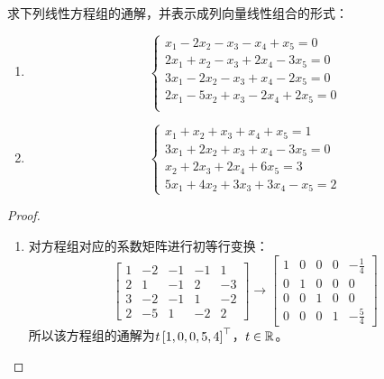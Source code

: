 \begin{problem}\label{problem-2.29}
求下列线性方程组的通解，并表示成列向量线性组合的形式：
\begin{enumerate}
    \item
          {
          \begin{equation*}
              \begin{cases}
                  x_1-2x_2-x_3-x_4+x_5=0    \\
                  2x_1+x_2-x_3+2x_4-3x_5=0  \\
                  3x_1-2x_2-x_3+x_4-2x_5=0  \\
                  2x_1-5x_2+x_3-2x_4+2x_5=0 \\
              \end{cases}
          \end{equation*}
          }
    \item \begin{equation*}
              \begin{cases}
                  x_1+x_2+x_3+x_4+x_5=1    \\
                  3x_1+2x_2+x_3+x_4-3x_5=0 \\
                  x_2+2x_3+2x_4+6x_5=3     \\
                  5x_1+4x_2+3x_3+3x_4-x_5=2
              \end{cases}
          \end{equation*}
\end{enumerate}
\end{problem}
\begin{proof}
    \begin{enumerate}
        \item 对方程组对应的系数矩阵进行初等行变换：
              \begin{equation*}
                  \begin{bmatrix}
                      1 & -2 & -1 & -1 & 1  \\
                      2 & 1  & -1 & 2  & -3 \\
                      3 & -2 & -1 & 1  & -2 \\
                      2 & -5 & 1  & -2 & 2
                  \end{bmatrix}\longrightarrow
                  \begin{bmatrix}
                      1 & 0 & 0 & 0 & -\frac{1}{4} \\
                      0 & 1 & 0 & 0 & 0            \\
                      0 & 0 & 1 & 0 & 0            \\
                      0 & 0 & 0 & 1 & -\frac{5}{4}
                  \end{bmatrix}
              \end{equation*}
              所以该方程组的通解为\(t\left[ 1,0,0,5,4 \right]^\top\)，\(t\in\boldsymbol{\mathbb{R}}\)。
    \end{enumerate}
\end{proof}

